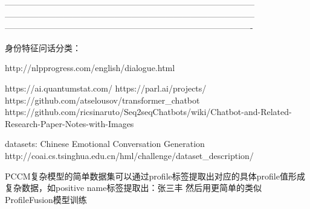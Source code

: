\documentclass[letterpaper]{article} %
\begin{document}
\begin{CJK*}{UTF8}{gbsn}
-----------------------------------------------------------------------------------------
-----------------------------------------------------------------------------------------
----------------------------------------------------------------------------------------



身份特征问话分类：


http://nlpprogress.com/english/dialogue.html

https://ai.quantumstat.com/
https://parl.ai/projects/
https://github.com/atselousov/transformer\_chatbot
https://github.com/ricsinaruto/Seq2seqChatbots/wiki/Chatbot-and-Related-Research-Paper-Notes-with-Images


datasets:
Chinese Emotional Conversation Generation
http://coai.cs.tsinghua.edu.cn/hml/challenge/dataset\_description/


PCCM复杂模型的简单数据集可以通过profile标签提取出对应的具体profile值形成复杂数据，如positive name标签提取出：张三丰
然后用更简单的类似ProfileFusion模型训练

\clearpage\end{CJK*}
\end{document}
